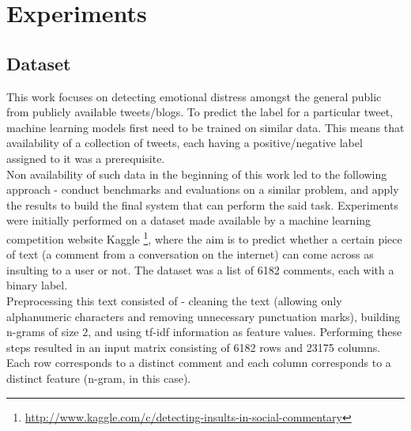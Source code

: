 \chapter{Experiments}
\label{chapter:Experiments}


\section{Dataset}
This work focuses on detecting emotional distress amongst the general public from publicly available tweets/blogs. To predict the label for a particular tweet, machine learning models first need to be trained on similar data. This means that availability of a collection of tweets, each having a positive/negative label assigned to it was a prerequisite.\\

Non availability of such data in the beginning of this work led to the following approach - conduct benchmarks and evaluations on a similar problem, and apply the results to build the final system that can perform the said task. Experiments were initially performed on a dataset made available by a machine learning competition website Kaggle \footnote{\url{http://www.kaggle.com/c/detecting-insults-in-social-commentary}}, where the aim is to predict whether a certain piece of text (a comment from a conversation on the internet) can come across as insulting to a user or not. The dataset was a list of 6182 comments, each with a binary label.\\

Preprocessing this text consisted of - cleaning the text (allowing only alphanumeric characters and removing unnecessary punctuation marks), building n-grams of size 2, and using tf-idf information as feature values. Performing these steps resulted in an input matrix consisting of 6182 rows and 23175 columns. Each row corresponds to a distinct comment and each column corresponds to a distinct feature (n-gram, in this case).\\

